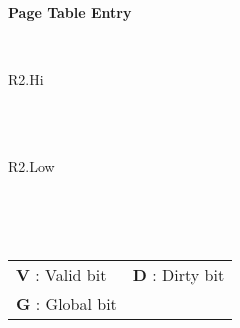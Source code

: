 \begin{minipage}{\textwidth}
\begin{framed}
	\begin{center}
		\textbf{Page Table Entry}
	\end{center}
	\centering
	\ttfamily
	\begin{bytefield}[bitwidth=10px,bitheight=25px,endianness=big]{32}
		\\
		\begin{rightwordgroup}{R2.Hi}
			   
		\end{rightwordgroup}\\
		\\
		\begin{rightwordgroup}{R2.Low}
			     
		\end{rightwordgroup}\\
	\end{bytefield}\\
	\begin{tabular}{ll}
	\textbf{V} : Valid bit & \textbf{D} : Dirty bit \\
	\textbf{G} : Global bit \\
	\end{tabular}
\end{framed}
\end{minipage}
